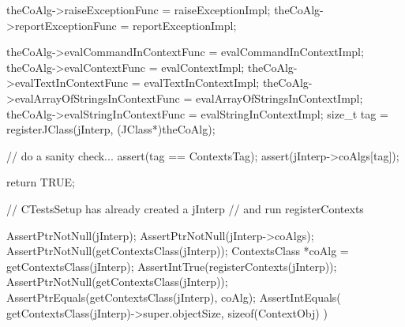 {  theCoAlg->raiseExceptionFunc     = raiseExceptionImpl;
  theCoAlg->reportExceptionFunc    = reportExceptionImpl;
  
  theCoAlg->evalCommandInContextFunc =
    evalCommandInContextImpl;
  theCoAlg->evalContextFunc        = evalContextImpl;
  theCoAlg->evalTextInContextFunc  = evalTextInContextImpl;
  theCoAlg->evalArrayOfStringsInContextFunc =
    evalArrayOfStringsInContextImpl;
  theCoAlg->evalStringInContextFunc =
    evalStringInContextImpl;
  size_t tag =
    registerJClass(jInterp, (JClass*)theCoAlg);

  // do a sanity check...
  assert(tag == ContextsTag);
  assert(jInterp->coAlgs[tag]);

  return TRUE;
}
\stopCCode


\startCTest
  // CTestsSetup has already created a jInterp
  // and run registerContexts
  
  AssertPtrNotNull(jInterp);
  AssertPtrNotNull(jInterp->coAlgs);
  AssertPtrNotNull(getContextsClass(jInterp));
  ContextsClass *coAlg = getContextsClass(jInterp);
  AssertIntTrue(registerContexts(jInterp));
  AssertPtrNotNull(getContextsClass(jInterp));
  AssertPtrEquals(getContextsClass(jInterp), coAlg);
  AssertIntEquals(
    getContextsClass(jInterp)->super.objectSize,
    sizeof(ContextObj)
  )
\stopCTest

\stopTestCase
\stopTestSuite
